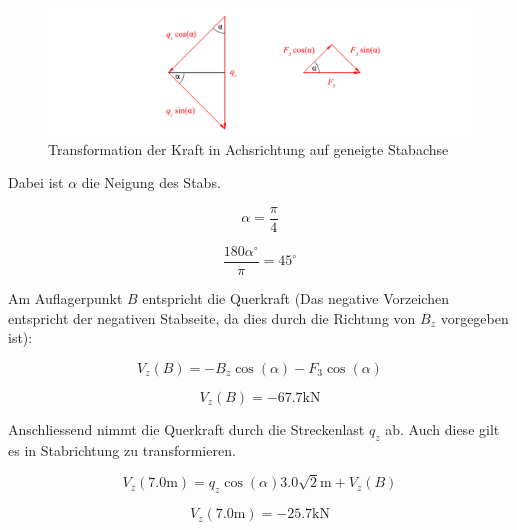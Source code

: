 \documentclass[
  12pt,
  letterpaper,
  DIV=11,
  egregdoesnotlikesansseriftitles]{scrartcl}
\begin{document}
\begin{figure}[H]

{\centering \includegraphics{BSI_HS23_Testat_02_files/mediabag/../images/Testat_02_HS23_Winkel.pdf}

}

\caption{\label{fig-winkel}Transformation der Kraft in Achsrichtung auf
geneigte Stabachse}

\end{figure}

Dabei ist \(\alpha\) die Neigung des Stabs.

\begin{equation}\alpha = \frac{\pi}{4}\end{equation}

\begin{equation}\frac{180 \alpha ^\circ}{\pi} = 45 ^\circ\end{equation}

Am Auflagerpunkt \(B\) entspricht die Querkraft (Das negative Vorzeichen
entspricht der negativen Stabseite, da dies durch die Richtung von
\(B_z\) vorgegeben ist):

\begin{equation}V_{z}{\left(B \right)} = - B_{z} \cos{\left(\alpha \right)} - F_{3} \cos{\left(\alpha \right)}\end{equation}

\begin{equation}V_{z}{\left(B \right)} = - 67.7 \text{k} \text{N}\end{equation}

Anschliessend nimmt die Querkraft durch die Streckenlast \(q_z\) ab.
Auch diese gilt es in Stabrichtung zu transformieren.

\begin{equation}V_{z}{\left(7.0 \text{m} \right)} = q_{z} \cos{\left(\alpha \right)} 3.0 \sqrt{2} \text{m} + V_{z}{\left(B \right)}\end{equation}

\begin{equation}V_{z}{\left(7.0 \text{m} \right)} = - 25.7 \text{k} \text{N}\end{equation}
\end{document}
